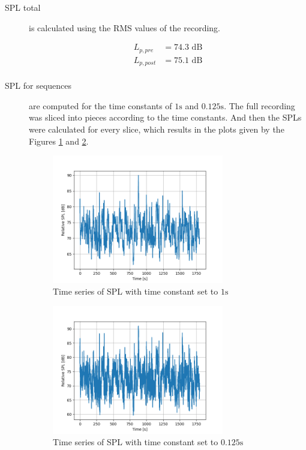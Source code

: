 \documentclass[twocolumn]{article}
\begin{document}
\begin{description}
\item[SPL total] is calculated using the RMS values of the recording.

\begin{equation}
\begin{aligned}
    L_{p,pre} & = 74.3 \textrm{ dB} \\
    L_{p,post} & = 75.1 \textrm{ dB} \\
\end{aligned}
\end{equation}

\item[SPL for sequences] are computed for the time constants of $1\textrm{s}$ and $0.125\textrm{s}$.
    The full recording was sliced into pieces according to the time constants.
    And then the SPLs were calculated for every slice, which results in the plots given by the Figures
    \ref{fig:time_constant_1s} and \ref{fig:time_constant_125ms}.

\begin{figure}[H]
    \centering
    \includegraphics[width=75mm]{./Images/time_constant_spl_1s.png}
    \caption{Time series of SPL with time constant set to $1\textrm{s}$}
    \label{fig:time_constant_1s}
\end{figure}

\begin{figure}[H]
    \centering
    \includegraphics[width=75mm]{./Images/time_constant_spl_125ms.png}
    \caption{Time series of SPL with time constant set to $0.125\textrm{s}$}
    \label{fig:time_constant_125ms}
\end{figure}


\end{description}
\end{document}
